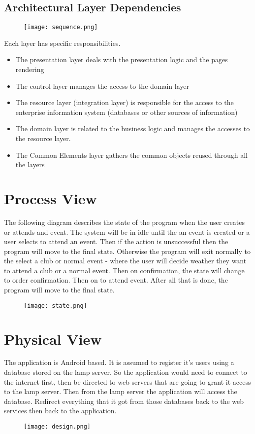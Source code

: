 \documentclass[10pt,a4paper]{article}
\begin{document}
\subsection{Architectural Layer Dependencies}
\begin{figure}[H]
\texttt{[image: sequence.png]}
\end{figure}
Each layer has specific responsibilities.
\begin{itemize}
\item The presentation layer deals with the presentation logic and the pages  rendering
\item The control layer manages the access to the domain layer
\item The resource layer (integration layer) is responsible for the access to the enterprise information system (databases or other sources of information)
\item The domain layer is related to the business logic and manages the accesses to the resource layer.
\item	The Common Elements layer gathers the common objects reused through all the layers
\end{itemize}

\section{Process View}
The following diagram describes the state of the program when the user creates or attends and event. The system will be in idle until the an event is created or a user selects to attend an event. Then if the action is unsuccessful then the program will move to the final state. Otherwise the program will exit normally to the select a club or normal event - where the user will decide weather they want to attend a club or a normal event. Then on confirmation, the state will change to order confirmation. Then on to attend event. After all that is done, the program will move to the final state.
\begin{figure}[H]
\texttt{[image: state.png]}
\end{figure}

\section{Physical View}

The application is Android based. It is assumed to register it's users using a database stored on the lamp server. So the application would need to connect to the internet first, then be directed to web servers that are going to grant it access to the lamp server. Then from the lamp server the application will access the database. Redirect everything that it got from those databases back to the web services then back to the application.
\begin{figure}[H]
\texttt{[image: design.png]}
\end{figure}
\end{document}

